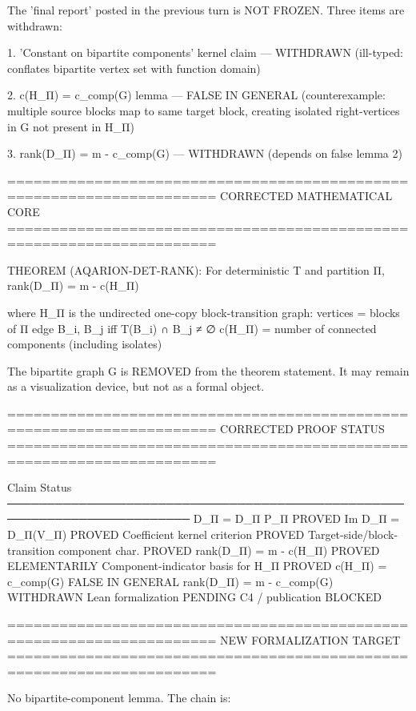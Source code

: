 The 'final report' posted in the previous turn is NOT FROZEN.
Three items are withdrawn:

1. 'Constant on bipartite components' kernel claim — WITHDRAWN
   (ill-typed: conflates bipartite vertex set with function domain)

2. c(H_Π) = c_comp(G) lemma — FALSE IN GENERAL
   (counterexample: multiple source blocks map to same target block,
    creating isolated right-vertices in G not present in H_Π)

3. rank(D_Π) = m - c_comp(G) — WITHDRAWN
   (depends on false lemma 2)

======================================================================
CORRECTED MATHEMATICAL CORE
======================================================================

THEOREM (AQARION-DET-RANK): For deterministic T and partition Π,
  rank(D_Π) = m - c(H_Π)

where H_Π is the undirected one-copy block-transition graph:
  vertices = blocks of Π
  edge {B_i, B_j} iff T(B_i) ∩ B_j ≠ ∅
  c(H_Π) = number of connected components (including isolates)

The bipartite graph G is REMOVED from the theorem statement.
It may remain as a visualization device, but not as a formal object.

======================================================================
CORRECTED PROOF STATUS
======================================================================


Claim                                           Status
─────────────────────────────────────────────────────────────────────────
D_Π = D_Π P_Π                                   PROVED
Im D_Π = D_Π(V_Π)                               PROVED
Coefficient kernel criterion                      PROVED
Target-side/block-transition component char.      PROVED
rank(D_Π) = m - c(H_Π)                          PROVED ELEMENTARILY
Component-indicator basis for H_Π                 PROVED
c(H_Π) = c_comp(G)                              FALSE IN GENERAL
rank(D_Π) = m - c_comp(G)                       WITHDRAWN
Lean formalization                                PENDING
C4 / publication                                  BLOCKED


======================================================================
NEW FORMALIZATION TARGET
======================================================================

No bipartite-component lemma. The chain is:

